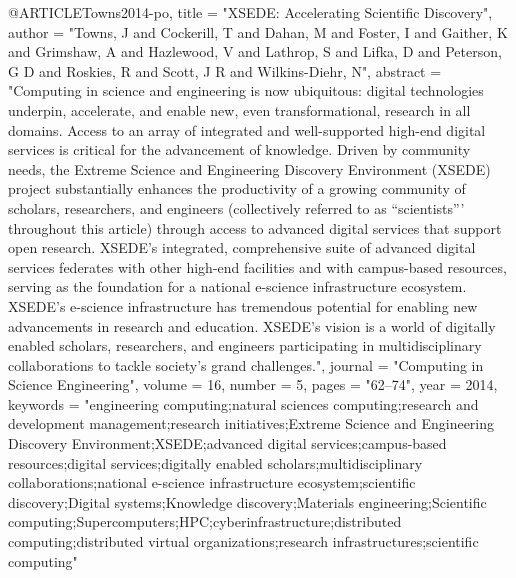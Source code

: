 @ARTICLE{Towns2014-po,
  title    = "{XSEDE}: Accelerating Scientific Discovery",
  author   = "Towns, J and Cockerill, T and Dahan, M and Foster, I and Gaither,
              K and Grimshaw, A and Hazlewood, V and Lathrop, S and Lifka, D
              and Peterson, G D and Roskies, R and Scott, J R and
              Wilkins-Diehr, N",
  abstract = "Computing in science and engineering is now ubiquitous: digital
              technologies underpin, accelerate, and enable new, even
              transformational, research in all domains. Access to an array of
              integrated and well-supported high-end digital services is
              critical for the advancement of knowledge. Driven by community
              needs, the Extreme Science and Engineering Discovery Environment
              (XSEDE) project substantially enhances the productivity of a
              growing community of scholars, researchers, and engineers
              (collectively referred to as ``scientists''' throughout this
              article) through access to advanced digital services that support
              open research. XSEDE's integrated, comprehensive suite of
              advanced digital services federates with other high-end
              facilities and with campus-based resources, serving as the
              foundation for a national e-science infrastructure ecosystem.
              XSEDE's e-science infrastructure has tremendous potential for
              enabling new advancements in research and education. XSEDE's
              vision is a world of digitally enabled scholars, researchers, and
              engineers participating in multidisciplinary collaborations to
              tackle society's grand challenges.",
  journal  = "Computing in Science Engineering",
  volume   =  16,
  number   =  5,
  pages    = "62--74",
  year     =  2014,
  keywords = "engineering computing;natural sciences computing;research and
              development management;research initiatives;Extreme Science and
              Engineering Discovery Environment;XSEDE;advanced digital
              services;campus-based resources;digital services;digitally
              enabled scholars;multidisciplinary collaborations;national
              e-science infrastructure ecosystem;scientific discovery;Digital
              systems;Knowledge discovery;Materials engineering;Scientific
              computing;Supercomputers;HPC;cyberinfrastructure;distributed
              computing;distributed virtual organizations;research
              infrastructures;scientific computing"
}

